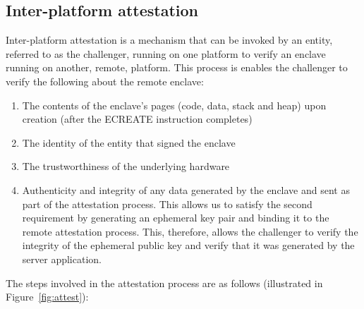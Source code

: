 \documentclass[../main.tex]{subfiles}
\begin{document}
\subsection{Inter-platform attestation} %
Inter-platform attestation is a mechanism that can be invoked by an entity, referred to as the challenger, running on one platform
to verify an enclave running on another, remote, platform. This process is enables the challenger to verify the following about the remote enclave:
\begin{enumerate}
	\item The contents of the enclave's pages (code, data, stack and heap) upon creation (after the ECREATE instruction completes)
	\item The identity of the entity that signed the enclave 
	\item The trustworthiness of the underlying hardware
	\item Authenticity and integrity of any data generated by the enclave and sent as part of the attestation process. This allows us to satisfy the second requirement by generating an ephemeral key
	      pair and binding it to the remote attestation process. This, therefore, allows the challenger to verify the integrity of the ephemeral public key and verify that it was generated by the server application.
\end{enumerate}
The steps involved in the attestation process are as follows (illustrated in Figure~\ref{fig:attest}):
\end{document}
